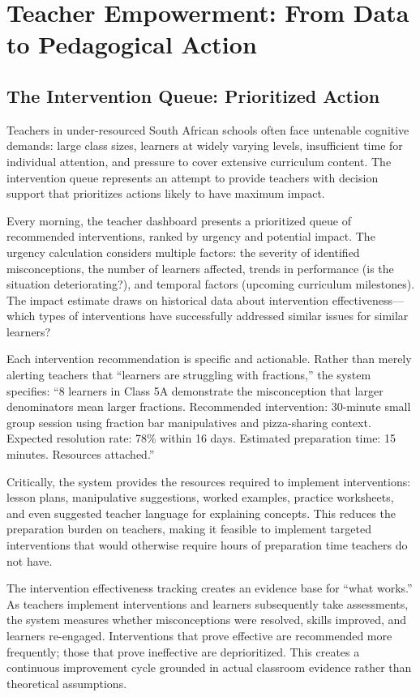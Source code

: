 \documentclass[12pt,a4paper]{article}
\begin{document}
\section{Teacher Empowerment: From Data to Pedagogical Action}

\subsection{The Intervention Queue: Prioritized Action}

Teachers in under-resourced South African schools often face untenable cognitive demands: large class sizes, learners at widely varying levels, insufficient time for individual attention, and pressure to cover extensive curriculum content. The intervention queue represents an attempt to provide teachers with decision support that prioritizes actions likely to have maximum impact.

Every morning, the teacher dashboard presents a prioritized queue of recommended interventions, ranked by urgency and potential impact. The urgency calculation considers multiple factors: the severity of identified misconceptions, the number of learners affected, trends in performance (is the situation deteriorating?), and temporal factors (upcoming curriculum milestones). The impact estimate draws on historical data about intervention effectiveness---which types of interventions have successfully addressed similar issues for similar learners?

Each intervention recommendation is specific and actionable. Rather than merely alerting teachers that ``learners are struggling with fractions,'' the system specifies: ``8 learners in Class 5A demonstrate the misconception that larger denominators mean larger fractions. Recommended intervention: 30-minute small group session using fraction bar manipulatives and pizza-sharing context. Expected resolution rate: 78\% within 16 days. Estimated preparation time: 15 minutes. Resources attached.''

Critically, the system provides the resources required to implement interventions: lesson plans, manipulative suggestions, worked examples, practice worksheets, and even suggested teacher language for explaining concepts. This reduces the preparation burden on teachers, making it feasible to implement targeted interventions that would otherwise require hours of preparation time teachers do not have.

The intervention effectiveness tracking creates an evidence base for ``what works.'' As teachers implement interventions and learners subsequently take assessments, the system measures whether misconceptions were resolved, skills improved, and learners re-engaged. Interventions that prove effective are recommended more frequently; those that prove ineffective are deprioritized. This creates a continuous improvement cycle grounded in actual classroom evidence rather than theoretical assumptions.
\end{document}
